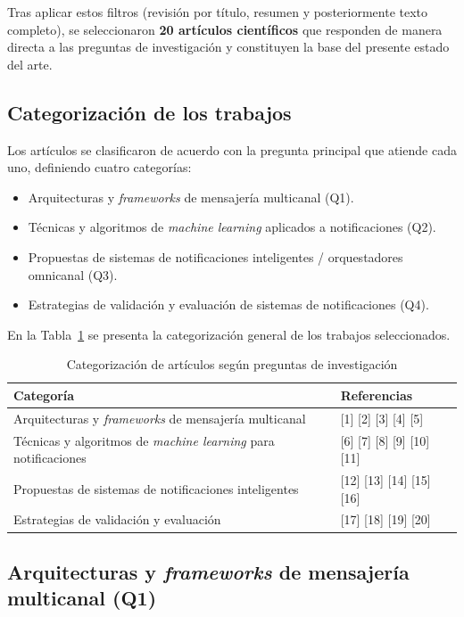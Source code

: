 \documentclass[conference]{IEEEtran}
\begin{document}
Tras aplicar estos filtros (revisión por título, resumen y posteriormente texto completo), se seleccionaron \textbf{20 artículos científicos} que responden de manera directa a las preguntas de investigación y constituyen la base del presente estado del arte.

\subsection{Categorización de los trabajos}

Los artículos se clasificaron de acuerdo con la pregunta principal que atiende cada uno, definiendo cuatro categorías:

\begin{itemize}
  \item Arquitecturas y \textit{frameworks} de mensajería multicanal (Q1).
  \item Técnicas y algoritmos de \textit{machine learning} aplicados a notificaciones (Q2).
  \item Propuestas de sistemas de notificaciones inteligentes / orquestadores omnicanal (Q3).
  \item Estrategias de validación y evaluación de sistemas de notificaciones (Q4).
\end{itemize}

En la Tabla~\ref{tab:categorizacion-articulos} se presenta la categorización general de los trabajos seleccionados.

\begin{table}[htbp]
  \caption{Categorización de artículos según preguntas de investigación}
  \label{tab:categorizacion-articulos}
  \centering
  \begin{tabular}{p{} p{}}
    \hline
    \textbf{Categoría} & \textbf{Referencias} \\
    \hline
    Arquitecturas y \textit{frameworks} de mensajería multicanal & [1] [2] [3] [4] [5] \\
    Técnicas y algoritmos de \textit{machine learning} para notificaciones & [6] [7] [8] [9] [10] [11] \\
    Propuestas de sistemas de notificaciones inteligentes & [12] [13] [14] [15] [16] \\
    Estrategias de validación y evaluación & [17] [18] [19] [20] \\
    \hline
  \end{tabular}
\end{table}

\subsection{Arquitecturas y \textit{frameworks} de mensajería multicanal (Q1)}
\end{document}

